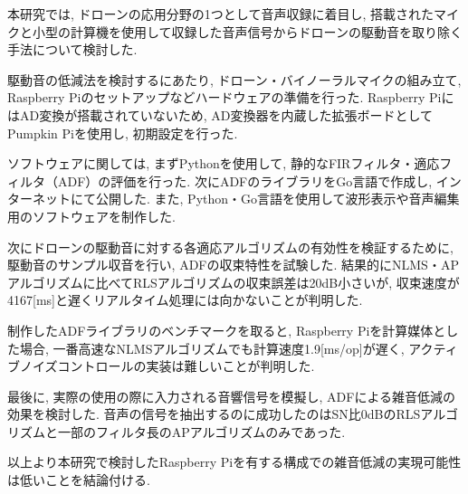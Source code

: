 \begin{jabstract}
本研究では, ドローンの応用分野の1つとして音声収録に着目し, 搭載されたマイクと小型の計算機を使用して収録した音声信号からドローンの駆動音を取り除く手法について検討した. 

駆動音の低減法を検討するにあたり, ドローン・バイノーラルマイクの組み立て, Raspberry
Piのセットアップなどハードウェアの準備を行った.  Raspberry
PiにはAD変換が搭載されていないため, AD変換器を内蔵した拡張ボードとしてPumpkin Piを使用し, 初期設定を行った. 

ソフトウェアに関しては, まずPythonを使用して, 静的なFIRフィルタ・適応フィルタ（ADF）の評価を行った. 次にADFのライブラリをGo言語で作成し, インターネットにて公開した. また, Python・Go言語を使用して波形表示や音声編集用のソフトウェアを制作した. 

次にドローンの駆動音に対する各適応アルゴリズムの有効性を検証するために, 駆動音のサンプル収音を行い, ADFの収束特性を試験した. 結果的にNLMS・APアルゴリズムに比べてRLSアルゴリズムの収束誤差は20dB小さいが, 収束速度が4167[ms]と遅くリアルタイム処理には向かないことが判明した. 

制作したADFライブラリのベンチマークを取ると, Raspberry Piを計算媒体とした場合, 一番高速なNLMSアルゴリズムでも計算速度1.9[ms/op]が遅く, アクティブノイズコントロールの実装は難しいことが判明した. 

最後に, 実際の使用の際に入力される音響信号を模擬し, ADFによる雑音低減の効果を検討した. 音声の信号を抽出するのに成功したのはSN比0dBのRLSアルゴリズムと一部のフィルタ長のAPアルゴリズムのみであった. 

以上より本研究で検討したRaspberry Piを有する構成での雑音低減の実現可能性は低いことを結論付ける. 
\end{jabstract}
